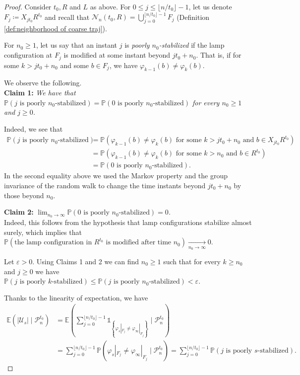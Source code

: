 \documentclass[10pt,a4paper]{amsart}
\newcommand{\E}{\mathbb{E}}
\renewcommand{\P}{\mathbb{P}}
\begin{document}
\begin{proof}
	Consider $t_0,R$ and $L$ as above. For $0\le j\le \lfloor n/t_0\rfloor-1$, let us denote $F_j\coloneqq X_{jt_0}R^{t_0}$ and recall that $\mathcal{N}_n(t_0,R)=\bigcup_{j=0}^{\lfloor n/t_0\rfloor-1}F_j$ (Definition \ref{def:neighborhood of coarse traj}).
	
	For $n_0\ge 1$, let us say that an instant $j$ is \emph{poorly $n_0$-stabilized} if the lamp configuration at $F_j$ is modified at some instant beyond $jt_0+n_0$. That is, if for some $k>jt_0+n_0$ and some $b\in F_j$, we have $\varphi_{k-1}(b)\neq \varphi_{k}(b)$.
	
	We observe the following.\\
	\textbf{Claim 1:} \textit{We have that \( \P(j \text{ is poorly }n_0\text{-stabilized})=\P(0 \text{ is poorly }n_0\text{-stabilized})\) for every $n_0\ge 1$ and $j\ge 0$.}
	
	
	Indeed, we see that
	\begin{align*}
		\P(j \text{ is poorly }n_0\text{-stabilized})&=\P(\varphi_{k-1}(b)\neq \varphi_{k}(b)\text{ for some }k>jt_0+n_0\text{ and }b\in X_{jt_0}R^{t_0})\\
		&=\P(\varphi_{k-1}(b)\neq \varphi_{k}(b)\text{ for some }k>n_0\text{ and }b\in R^{t_0})\\
		&=\P(0 \text{ is poorly }n_0\text{-stabilized}).
	\end{align*}
	In the second equality above we used the Markov property and the group invariance of the random walk to change the time instants beyond $jt_0+n_0$ by those beyond $n_0$.
	
	\textbf{Claim 2:}\textit{ $\lim_{n_0\to \infty}\P(0 \text{ is poorly }n_0\text{-stabilized})=0$.}\\
	Indeed, this follows from the hypothesis that lamp configurations stabilize almost surely, which implies that $\P(\text{the lamp configuration in }R^{t_0} \text{ is modified after time $n_0$})\xrightarrow[n_0\to \infty]{}0.$
	
	Let $\varepsilon>0$. Using Claims 1 and 2 we can find $n_0\ge 1$ such that for every $k\ge n_0$ and $j\ge 0$ we have $
		\P(j \text{ is poorly }k\text{-stabilized})\le \P(j \text{ is poorly }n_0\text{-stabilized})<\varepsilon.$
	
	Thanks to the linearity of expectation, we have
	\begin{align*}
		\E\left(|\mathcal{U}_s| \mid \mathcal{P}_n^{t_0}\right)&= 
		\E\left(\sum_{j=0}^{\lfloor n/t_0\rfloor-1}\mathds{1}_{\left\{\varphi_s|_{F_j}\neq \varphi_{\infty}|_{F_j}\right \}} \mid \mathcal{P}_n^{t_0}\right)\\
		&=
		\sum_{j=0}^{\lfloor n/t_0\rfloor-1}\P\left(\varphi_s|_{F_j}\neq \varphi_{\infty}|_{F_j}\mid \mathcal{P}_n^{t_0}\right)=\sum_{j=0}^{\lfloor n/t_0\rfloor-1} \P(j\text{ is poorly }s\text{-stabilized}).
	\end{align*}
	

\end{proof}
\end{document}
